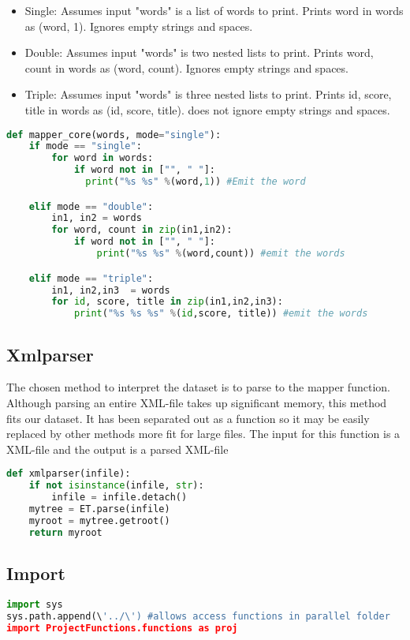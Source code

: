 \documentclass[fleqn,10pt]{wlscirep}
\begin{document}
\begin{itemize}
  \item Single: Assumes input "words" is a list of words to print. Prints word in words as (word, 1). Ignores empty strings and spaces.
  \item Double: Assumes input "words" is two nested lists to print. Prints word, count in words as (word, count). Ignores empty strings and spaces.
  \item Triple: Assumes input "words" is three nested lists to print. Prints id, score, title in words as (id, score, title). does not ignore empty strings and spaces.
\end{itemize}

\begin{lstlisting}[language=Python, caption=mapper\_core function]
def mapper_core(words, mode="single"):
    if mode == "single":
        for word in words:
            if word not in ["", " "]:
              print("%s %s" %(word,1)) #Emit the word

    elif mode == "double":
        in1, in2 = words
        for word, count in zip(in1,in2):
            if word not in ["", " "]:
                print("%s %s" %(word,count)) #emit the words

    elif mode == "triple":
        in1, in2,in3  = words
        for id, score, title in zip(in1,in2,in3):
            print("%s %s %s" %(id,score, title)) #emit the words


\end{lstlisting}

\subsection{Xmlparser}
The chosen method to interpret the dataset is to parse to the mapper function. Although parsing an entire XML-file takes up significant memory, this method fits our dataset. It has been separated out as a function so it may be easily replaced by other methods more fit for large files. The input for this function is a XML-file and the output is a parsed XML-file 

\begin{lstlisting}[language=Python, caption=xmlparser function]
def xmlparser(infile):
    if not isinstance(infile, str):
        infile = infile.detach()
    mytree = ET.parse(infile)
    myroot = mytree.getroot()
    return myroot
\end{lstlisting}

\subsection{Import}
\begin{lstlisting}[language=Python, caption=xmlparser function]
import sys
sys.path.append(\'../\') #allows access functions in parallel folder
import ProjectFunctions.functions as proj
\end{lstlisting}
\end{document}
